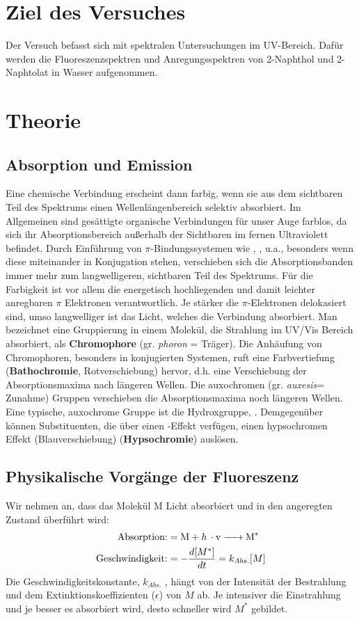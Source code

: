 \documentclass[12pt]{article}
\begin{document}
\section{Ziel des Versuches}
Der Versuch befasst sich mit spektralen Untersuchungen im UV-Bereich. Dafür werden die Fluoreszenzspektren und Anregungsspektren von 2-Naphthol und 2-Naphtolat in Wasser aufgenommen.
\section {Theorie}
\subsection{Absorption und Emission\supercite{og}}
\glqq Eine chemische Verbindung erscheint dann farbig, wenn sie aus dem sichtbaren Teil des Spektrums einen Wellenlängenbereich selektiv absorbiert.
Im Allgemeinen sind gesättigte organische Verbindungen für unser Auge farblos, da sich ihr Absorptionsbereich außerhalb der Sichtbaren im fernen Ultraviolett
befindet. Durch Einführung von $\pi$-Bindungssystemen wie , ,  u.a., besonders wenn diese miteinander in Konjugation stehen, verschieben sich
die Absorptionsbanden immer mehr zum langwelligeren, sichtbaren Teil des Spektrums.
Für die Farbigkeit ist vor allem die energetisch hochliegenden und damit leichter anregbaren $\pi$ Elektronen verantwortlich.
Je stärker die $\pi$-Elektronen delokasiert sind, umso langwelliger ist das Licht, welches die Verbindung absorbiert.
Man bezeichnet eine Gruppierung in einem Molekül, die Strahlung im UV/Vis Bereich absorbiert, als \textbf{Chromophore} (gr. \textit{phoron} = Träger). Die Anhäufung von Chromophoren,
besonders in konjugierten Systemen, ruft eine Farbvertiefung (\textbf{Bathochromie}, Rotverschiebung) hervor, d.h. eine Verschiebung der Absorptionsmaxima nach längeren Wellen.
Die auxochromen (gr. \textit{auxesis}= Zunahme) Gruppen verschieben die Absorptionsmaxima noch längeren Wellen. Eine typische, auxochrome Gruppe ist die Hydroxgruppe, .
Demgegenüber können Substituenten, die über einen -Effekt verfügen, einen hypsochromen Effekt (Blauverschiebung) (\textbf{Hypsochromie}) auslösen.\grqq

\subsection{Physikalische Vorgänge der Fluoreszenz\supercite{harris}}
Wir nehmen an, dass das Molekül M Licht absorbiert und in den angeregten Zustand 
überführt wird:
\begin{align*}
 \text{Absorption:} &= \ce{M + h \cdot v -> M^*}\\
 \text{Geschwindigkeit:} &= - \frac{d[M^*]}{dt} = k _{Abs.} [M]
\end{align*}
Die Geschwindigkeitskonstante, $k_{Abs.}$ , hängt von der Intensität der Bestrahlung und
dem Extinktionskoeffizienten ($\epsilon$) von $M$ ab. Je intensiver die Einstrahlung und je besser es
absorbiert wird, desto schneller wird $M^*$ gebildet.
\end{document}
